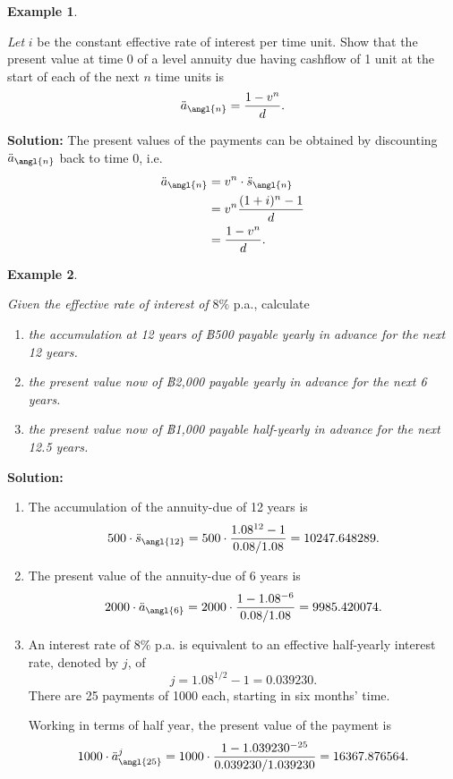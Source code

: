 \documentclass[
]{book}
\theoremstyle{definition}
\theoremstyle{definition}
\newtheorem{example}{Example}[chapter]
\theoremstyle{definition}
\theoremstyle{definition}
\theoremstyle{remark}
\begin{document}
\begin{example}
\protect\hypertarget{exm:unlabeled-div-31}{}\label{exm:unlabeled-div-31}

\emph{Let} \(i\) be the constant effective rate of interest per time unit. Show
that the present value at time 0 of a level annuity due having cashflow
of 1 unit at the start of each of the next \(n\) time units is
\[\ddot{a}_\angl{n} =  \frac{1 - v^n }{d}.\]

\end{example}

\textbf{Solution:} The present values of the payments can be obtained by
discounting \(\ddot{a}_\angl{n}\) back to time 0, i.e.~\[\begin{aligned}
 \ddot{a}_\angl{n} &= v^n  \cdot  \ddot{s}_\angl{n} \\
            &= v^n  \frac{(1+i)^n -1 }{d} \\
            &=\frac{1 - v^n}{d}.\end{aligned}\]

\begin{example}
\protect\hypertarget{exm:unlabeled-div-32}{}\label{exm:unlabeled-div-32}

\emph{Given the effective rate of interest of} \(8\%\) p.a., calculate

\begin{enumerate}
\def\labelenumi{\arabic{enumi}.}
\item
  \emph{the accumulation at 12 years of ฿500 payable yearly in advance for
  the next 12 years.}
\item
  \emph{the present value now of ฿2,000 payable yearly in advance for the
  next 6 years.}
\item
  \emph{the present value now of ฿1,000 payable half-yearly in advance for
  the next 12.5 years.}
\end{enumerate}

\end{example}

\textbf{Solution:}

\begin{enumerate}
\def\labelenumi{\arabic{enumi}.}
\item
  The accumulation of the annuity-due of 12 years is
  \[500 \cdot \ddot{s}_\angl{12} = 500 \cdot \frac{1.08^{12} -1}{0.08/1.08} = 10247.648289.\]
\item
  The present value of the annuity-due of 6 years is
  \[2000 \cdot \ddot{a}_\angl{6} = 2000 \cdot \frac{1- 1.08^{-6}}{0.08/1.08} = 9985.420074.\]
\item
  An interest rate of 8\% p.a. is equivalent to an effective
  half-yearly interest rate, denoted by \(j\), of
  \[j = 1.08^{1/2} -1 = 0.039230.\] There are 25 payments of 1000
  each, starting in six months' time.

  Working in terms of half year, the present value of the payment is
  \[1000 \cdot \ddot{a}^j_\angl{25} = 1000 \cdot \frac{1 - 1.039230^{-25} }{0.039230/1.039230 } = 16367.876564.\]
\end{enumerate}
\end{document}
